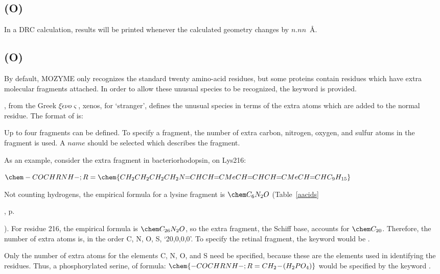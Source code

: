 \subsection*{ (O)}
        In  a  DRC  calculation,  results  will  be  printed  whenever   the
   calculated geometry changes by $n.nn$~\AA.

\subsection*{ (O)} \label{xeno} By default,
MOZYME only recognizes the standard twenty amino-acid residues, but
some proteins contain residues which have extra molecular fragments
attached.  In order to allow these unusual species to be recognized,
the keyword  is provided.

, from the Greek $\xi\acute{\epsilon}\nu o\varsigma$, xenos,
for `stranger', defines the unusual species in terms of the extra atoms
which are added to the normal residue.  The format of  is:


Up to four fragments can be defined.  To specify a fragment, the number
of extra carbon, nitrogen, oxygen, and sulfur atoms in the fragment is
used.  A $name$ should be selected which describes the fragment.

As an example, consider the extra fragment in bacteriorhodopsin, on
Lys216:

$\chem  -COCHRNH- ;  R = \chem{CH_2CH_2CH_2CH_2N\!\!=\!\!CHCH\!\!=\!\!CMeCH\!\!=\!\!CHCH\!\!=\!\!CMeCH\!\!=\!\!CHC_9H_{15}}$

Not counting hydrogens, the empirical formula for a lysine fragment is
$\chem C_6N_2O$ (Table~\ref{aacids}
\begin{latexonly}
, p.~\pageref{aacids}
\end{latexonly}).  For residue 216, the empirical
formula is $\chem C_{26}N_2O$, so the extra fragment, the Schiff base,
accounts for $\chem C_{20}$.  Therefore, the number of extra atoms is,
in the order C, N, O, S, `20,0,0,0'.  To specify the retinal fragment,
the keyword would be .

Only the number of extra atoms for the elements C, N, O, and S need be
specified, because these are the elements used in identifying the
residues.  Thus, a phosphorylated serine, of formula:
$\chem{-COCHRNH- ; R = CH_2\! -\! (H_2PO_4)}$
would be specified by the keyword
.

